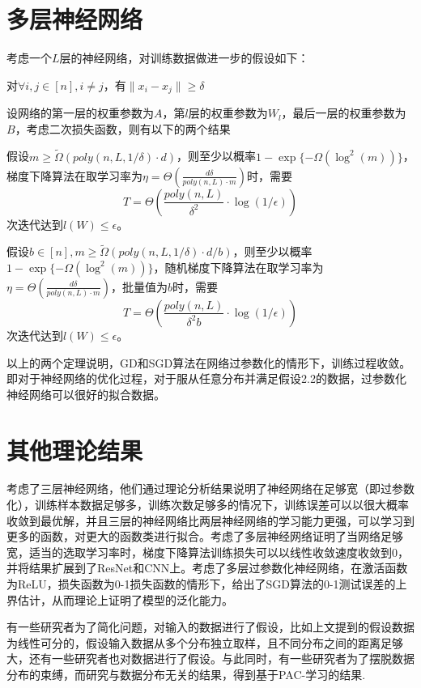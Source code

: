 \section{多层神经网络}
考虑一个$L$层的神经网络，对训练数据做进一步的假设如下：
\begin{assumption}
对$\forall i,j\in [n], i\neq j$，有$\|x_i-x_j\|\geq \delta$
\end{assumption}
\par
设网络的第一层的权重参数为$A$，第$l$层的权重参数为$W_l$，最后一层的权重参数为$B$，考虑二次损失函数，则有以下的两个结果\cite{allen2018convergence}
\begin{theorem}
假设$m\geq \tilde{\Omega}(poly(n,L,1/\delta)\cdot d)$，则至少以概率$1-\exp\{-\Omega(\log^2(m))\}$，梯度下降算法在取学习率为$\eta = \Theta(\frac{d\delta}{poly(n,L)\cdot m})$时，需要
\[
T = \Theta(\frac{poly(n,L)}{\delta^2}\cdot \log(1/\epsilon))
\]
次迭代达到$l(W)\leq \epsilon$。
\end{theorem}
\begin{theorem}
假设$b\in [n], m\geq \tilde{\Omega}(poly(n,L,1/\delta)\cdot d/b)$，则至少以概率$1-\exp\{-\Omega(\log^2(m))\}$，随机梯度下降算法在取学习率为$\eta = \Theta(\frac{d\delta}{poly(n,L)\cdot m})$，批量值为$b$时，需要
\[
T = \Theta(\frac{poly(n,L)}{\delta^2b}\cdot \log(1/\epsilon))
\]
次迭代达到$l(W)\leq \epsilon$。
\end{theorem}
\par
以上的两个定理说明，GD和SGD算法在网络过参数化的情形下，训练过程收敛。即对于神经网络的优化过程，对于服从任意分布并满足假设2.2的数据，过参数化神经网络可以很好的拟合数据。

\section{其他理论结果}
\citet{allen2019learning}考虑了三层神经网络，他们通过理论分析结果说明了神经网络在足够宽（即过参数化），训练样本数据足够多，训练次数足够多的情况下，训练误差可以以很大概率收敛到最优解，并且三层的神经网络比两层神经网络的学习能力更强，可以学习到更多的函数，对更大的函数类进行拟合。\citet{du2018gradient}考虑了多层神经网络证明了当网络足够宽，适当的选取学习率时，梯度下降算法训练损失可以以线性收敛速度收敛到0，并将结果扩展到了ResNet和CNN上。\citet{cao2019generalization}考虑了多层过参数化神经网络，在激活函数为ReLU，损失函数为0-1损失函数的情形下，给出了SGD算法的0-1测试误差的上界估计，从而理论上证明了模型的泛化能力。
\par
有一些研究者为了简化问题，对输入的数据进行了假设，比如上文提到的\citet{brutzkus2017sgd}假设数据为线性可分的，\citet{li2018learning}假设输入数据从多个分布独立取样，且不同分布之间的距离足够大，还有一些研究者也对数据进行了假设\cite{ge2017learning,kawaguchi2016deep}。与此同时，有一些研究者为了摆脱数据分布的束缚，而研究与数据分布无关的结果，得到基于PAC-学习的结果\cite{neyshabur2017pac,allen2019learning,pitas2019better,arora2018stronger}.